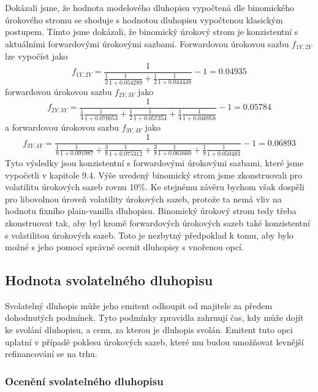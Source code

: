 \documentclass[a4paper]{book}
\begin{document}
Dokázali jsme, že hodnota modelového dluhopisu vypočtená dle binomického úrokového stromu se shoduje s hodnotou dluhopisu vypočtenou klasickým postupem. Tímto jsme dokázali, že binomický úrokový strom je konzistentní s aktuálními forwardovými úrokovými sazbami. Forwardovou úrokovou sazbu $f_{1Y,2Y}$ lze vypočíst jako
\begin{equation*}
f_{1Y, 2Y} = \frac{1}{\frac{1}{2}\frac{1}{1 + 0.054289} + \frac{1}{2}\frac{1}{1 + 0.044448}} - 1 = 0.04935
\end{equation*}
forwardovou úrokovou sazbu $f_{2Y, 3Y}$ jako
\begin{equation*}
f_{2Y, 3Y} = \frac{1}{\frac{1}{4}\frac{1}{1 + 0.070053} + \frac{1}{2}\frac{1}{1 + 0.057354} + \frac{1}{4}\frac{1}{1 + 0.046958}} - 1 = 0.05784
\end{equation*}
a forwardovou úrokovou sazbu $f_{3Y, 4Y}$ jako
\begin{equation*}
f_{3Y, 4Y} = \frac{1}{\frac{1}{8}\frac{1}{1 + 0.091987} + \frac{3}{8}\frac{1}{1 + 0.075312} + \frac{3}{8}\frac{1}{1 + 0.061660} + \frac{1}{8}\frac{1}{1 + 0.050483}} - 1 = 0.06893
\end{equation*}
Tyto výsledky jsou konzistentní s forwardovými úrokovými sazbami, které jsme vypočetli v kapitole 9.4. Výše uvedený binomický strom jsme zkonstruovali pro volatilitu úrokových sazeb rovnu 10\%. Ke stejnému závěru bychom však dospěli pro libovolnou úroveň volatility úrokových sazeb, protože ta nemá vliv na hodnotu fixního plain-vanilla dluhopisu. Binomický úrokový strom tedy třeba zkonstruovat tak, aby byl kromě forwardových úrokových sazeb také konzistentní s volatilitou úrokových sazeb. Toto je nezbytný předpoklad k tomu, aby bylo možné s jeho pomocí správně ocenit dluhopisy s vnořenou opcí.

\subsection{Hodnota svolatelného dluhopisu}

Svolatelný dluhopis může jeho emitent odkoupit od majitele za předem dohodnutých podmínek. Tyto podmínky zpravidla zahrnují čas, kdy může dojít ke svolání dluhopisu, a cenu, za kterou je dluhopis svolán. Emitent tuto opci uplatní v případě poklesu úrokových sazeb, které mu budou umožňovat levnější refinancování se na trhu.

\subsubsection{Ocenění svolatelného dluhopisu}
\end{document}
